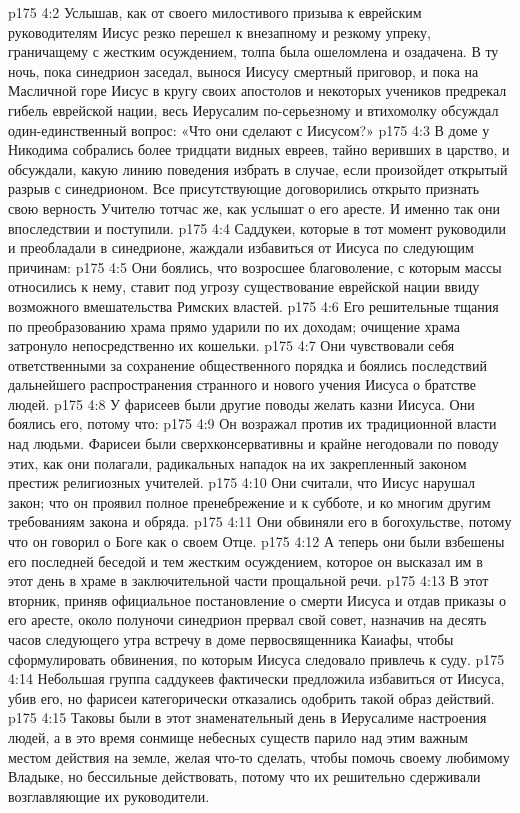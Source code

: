 \vs p175 4:2 \pc Услышав, как от своего милостивого призыва к еврейским руководителям Иисус резко перешел к внезапному и резкому упреку, граничащему с жестким осуждением, толпа была ошеломлена и озадачена. В ту ночь, пока синедрион заседал, вынося Иисусу смертный приговор, и пока на Масличной горе Иисус в кругу своих апостолов и некоторых учеников предрекал гибель еврейской нации, весь Иерусалим по\hyp{}серьезному и втихомолку обсуждал один\hyp{}единственный вопрос: «Что они сделают с Иисусом?»
\vs p175 4:3 \pc В доме у Никодима собрались более тридцати видных евреев, тайно веривших в царство, и обсуждали, какую линию поведения избрать в случае, если произойдет открытый разрыв с синедрионом. Все присутствующие договорились открыто признать свою верность Учителю тотчас же, как услышат о его аресте. И именно так они впоследствии и поступили.
\vs p175 4:4 Саддукеи, которые в тот момент руководили и преобладали в синедрионе, жаждали избавиться от Иисуса по следующим причинам:
\vs p175 4:5 \bibnobreakspace Они боялись, что возросшее благоволение, с которым массы относились к нему, ставит под угрозу существование еврейской нации ввиду возможного вмешательства Римских властей.
\vs p175 4:6 \bibnobreakspace Его решительные тщания по преобразованию храма прямо ударили по их доходам; очищение храма затронуло непосредственно их кошельки.
\vs p175 4:7 \bibnobreakspace Они чувствовали себя ответственными за сохранение общественного порядка и боялись последствий дальнейшего распространения странного и нового учения Иисуса о братстве людей.
\vs p175 4:8 \pc У фарисеев были другие поводы желать казни Иисуса. Они боялись его, потому что:
\vs p175 4:9 \bibnobreakspace Он возражал против их традиционной власти над людьми. Фарисеи были сверхконсервативны и крайне негодовали по поводу этих, как они полагали, радикальных нападок на их закрепленный законом престиж религиозных учителей.
\vs p175 4:10 \bibnobreakspace Они считали, что Иисус нарушал закон; что он проявил полное пренебрежение и к субботе, и ко многим другим требованиям закона и обряда.
\vs p175 4:11 \bibnobreakspace Они обвиняли его в богохульстве, потому что он говорил о Боге как о своем Отце.
\vs p175 4:12 \bibnobreakspace А теперь они были взбешены его последней беседой и тем жестким осуждением, которое он высказал им в этот день в храме в заключительной части прощальной речи.
\vs p175 4:13 \pc В этот вторник, приняв официальное постановление о смерти Иисуса и отдав приказы о его аресте, около полуночи синедрион прервал свой совет, назначив на десять часов следующего утра встречу в доме первосвященника Каиафы, чтобы сформулировать обвинения, по которым Иисуса следовало привлечь к суду.
\vs p175 4:14 Небольшая группа саддукеев фактически предложила избавиться от Иисуса, убив его, но фарисеи категорически отказались одобрить такой образ действий.
\vs p175 4:15 \pc Таковы были в этот знаменательный день в Иерусалиме настроения людей, а в это время сонмище небесных существ парило над этим важным местом действия на земле, желая что\hyp{}то сделать, чтобы помочь своему любимому Владыке, но бессильные действовать, потому что их решительно сдерживали возглавляющие их руководители.
